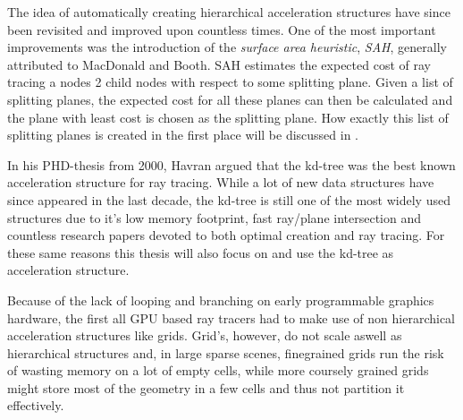
The idea of automatically creating hierarchical acceleration
structures have since been revisited and improved upon countless
times. One of the most important improvements was the introduction of
the \textit{surface area heuristic}, \textit{SAH}, generally
attributed to MacDonald and Booth. SAH
estimates the expected cost of ray tracing a nodes 2 child nodes with
respect to some splitting plane. Given a list of splitting planes, the
expected cost for all these planes can then be calculated and the
plane with least cost is chosen as the splitting plane. How exactly
this list of splitting planes is created in the first place will be
discussed in .



In his PHD-thesis from 2000, Havran argued that
the kd-tree was the best known acceleration structure for ray
tracing. While a lot of new data structures have since appeared in the
last decade, the kd-tree is still one of the most widely used
structures due to it's low memory footprint, fast ray/plane
intersection and countless research papers devoted to both optimal
creation and ray tracing. For these same reasons this thesis will also
focus on and use the kd-tree as acceleration structure.




Because of the lack of looping and branching on early programmable
graphics hardware, the first all GPU based ray tracers had to make use
of non hierarchical acceleration structures like
grids. Grid's, however, do not scale aswell as
hierarchical structures and, in large sparse scenes, finegrained grids
run the risk of wasting memory on a lot of empty cells, while more
coursely grained grids might store most of the geometry in a few cells
and thus not partition it effectively.


